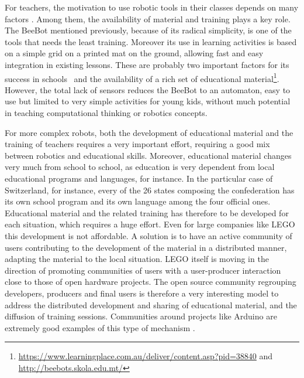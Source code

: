 \documentclass[letterpaper, 10 pt, conference]{ieeeconf}  %
\begin{document}
For teachers, the motivation to use robotic tools in their classes depends on many factors \cite{chevalier2016}.
Among them, the availability of material and training plays a key role.
The BeeBot mentioned previously, because of its radical simplicity, is one of the tools that needs the least training. 
Moreover its use in learning activities is based on a simple grid on a printed mat on the ground, allowing fast and easy integration in existing lessons.
These are probably two important factors for its success in schools~\cite{2008highfield,2008demichele} and the availability of a rich set of educational material\footnote{\url{https://www.learningplace.com.au/deliver/content.asp?pid=38840} and \\ \url{http://beebots.skola.edu.mt/}}.
However, the total lack of sensors reduces the BeeBot to an automaton, easy to use but limited to very simple activities for young kids, without much potential in teaching computational thinking or robotics concepts.

For more complex robots, both the development of educational material and the training of teachers requires a very important effort, requiring a good mix between robotics and educational skills. 
Moreover, educational material changes very much from school to school, as education is very dependent from local educational programs and languages, for instance. 
In the particular case of Switzerland, for instance, every of the 26 states composing the confederation has its own school program and its own language among the four official ones. 
Educational material and the related training has therefore to be developed for each situation, which requires a huge effort.
Even for large companies like LEGO this development is not affordable. 
A solution is to have an active community of users contributing to the development of the material in a distributed manner, adapting the material to the local situation.
LEGO itself is moving in the direction of promoting communities of users \cite{Hienerth2014} with a user-producer interaction close to those of open hardware projects.
The open source community regrouping developers, producers and final users is therefore a very interesting model to address the distributed development and sharing of educational material, and the diffusion of training sessions.
Communities around projects like Arduino are extremely good examples of this type of mechanism \cite{Jamieson2010}.

\end{document}

